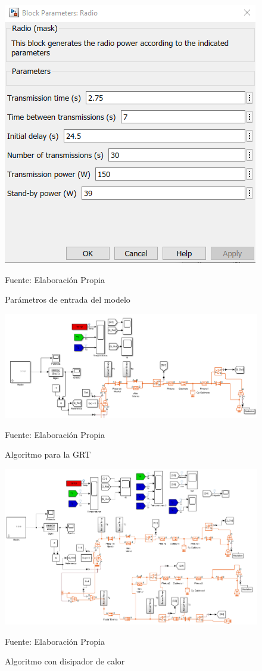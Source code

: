 \begin{figure}[H]
\centering
\includegraphics[scale=0.7]{Figuras/parametros_resultado.png}
\caption{Parámetros de entrada del modelo}
Fuente: Elaboración Propia
\label{anexo8}
\end{figure}


\begin{figure}[H]
\centering
\includegraphics[width=\linewidth]{Figuras/Algoritmo_GTR.png} %
\caption{Algoritmo para la GRT}
Fuente: Elaboración Propia
\label{anexo10}
\end{figure}

\begin{figure}[H]
\centering
\includegraphics[scale=0.6]{Figuras/algoritmo_final.png}
\caption{Algoritmo con disipador de calor}
Fuente: Elaboración Propia
\label{anexo11}
\end{figure}

